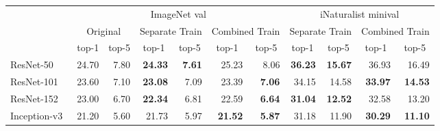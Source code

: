 \documentclass[10pt,twocolumn,letterpaper]{article}
\begin{document}
\begin{table*}[t]
\small
\begin{center}
\begin{tabular}{ lcccccccccc }
\hline
\multirow{3}{*}{} & \multicolumn{6}{|c}{ImageNet val} & \multicolumn{4}{|c}{iNaturalist minival} \\
\cline{2-11}
 & \multicolumn{2}{|c}{Original} & \multicolumn{2}{|c}{Separate Train} & \multicolumn{2}{|c}{Combined Train} & \multicolumn{2}{|c}{Separate Train} & \multicolumn{2}{|c}{Combined Train} \\
\cline{2-11}
 & \multicolumn{1}{|c}{top-1} & \multicolumn{1}{|c}{top-5} & \multicolumn{1}{|c}{top-1} & \multicolumn{1}{|c}{top-5} & \multicolumn{1}{|c}{top-1} & \multicolumn{1}{|c}{top-5} & \multicolumn{1}{|c}{top-1} & \multicolumn{1}{|c}{top-5} & \multicolumn{1}{|c}{top-1} & \multicolumn{1}{|c}{top-5} \\ \hline
\multicolumn{1}{l}{ResNet-50~\cite{resnet,resnet-v2}} & \multicolumn{1}{|r}{24.70} & \multicolumn{1}{|r}{7.80} & \multicolumn{1}{|r}{\textbf{24.33}} & \multicolumn{1}{|r}{\textbf{7.61}} & \multicolumn{1}{|r}{25.23} & \multicolumn{1}{|r}{8.06} & \multicolumn{1}{|r}{\textbf{36.23}} & \multicolumn{1}{|r}{\textbf{15.67}} & \multicolumn{1}{|r}{36.93} & \multicolumn{1}{|r}{16.49} \\
\multicolumn{1}{l}{ResNet-101~\cite{resnet,resnet-v2}} & \multicolumn{1}{|r}{23.60} & \multicolumn{1}{|r}{7.10} & \multicolumn{1}{|r}{\textbf{23.08}} & \multicolumn{1}{|r}{7.09} & \multicolumn{1}{|r}{23.39} & \multicolumn{1}{|r}{\textbf{7.06}} & \multicolumn{1}{|r}{34.15} & \multicolumn{1}{|r}{14.58} & \multicolumn{1}{|r}{\textbf{33.97}} & \multicolumn{1}{|r}{\textbf{14.53}} \\
\multicolumn{1}{l}{ResNet-152~\cite{resnet,resnet-v2}} & \multicolumn{1}{|r}{23.00} & \multicolumn{1}{|r}{6.70} & \multicolumn{1}{|r}{\textbf{22.34}} & \multicolumn{1}{|r}{6.81} & \multicolumn{1}{|r}{22.59} & \multicolumn{1}{|r}{\textbf{6.64}} & \multicolumn{1}{|r}{\textbf{31.04}} & \multicolumn{1}{|r}{\textbf{12.52}} & \multicolumn{1}{|r}{32.58} & \multicolumn{1}{|r}{13.20} \\ \hline \hline
\multicolumn{1}{l}{Inception-v3~\cite{inception-v3}} & \multicolumn{1}{|r}{21.20} & \multicolumn{1}{|r}{5.60} & \multicolumn{1}{|r}{21.73} & \multicolumn{1}{|r}{5.97} & \multicolumn{1}{|r}{\textbf{21.52}} & \multicolumn{1}{|r}{\textbf{5.87}} & \multicolumn{1}{|r}{31.18} & \multicolumn{1}{|r}{11.90} & \multicolumn{1}{|r}{\textbf{30.29}} & \multicolumn{1}{|r}{\textbf{11.10}} \\

\end{tabular}
\end{center}
\end{table*}
\end{document}
